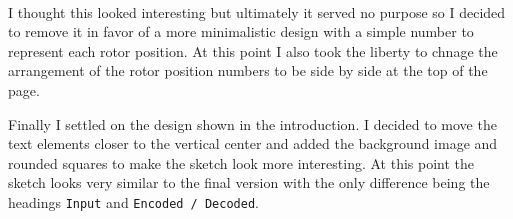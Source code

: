 \documentclass[12pt,a4paper]{article}
\begin{document}
		\begin{center}
			\\
		\end{center}
		\vspace{0.5cm}
		I thought this looked interesting but ultimately it served no purpose so I decided to 
		remove it in favor of a more minimalistic design with a simple number to represent 
		each rotor position. At this point I also took the liberty to chnage the arrangement of 
		the rotor position numbers to be side by side at the top of the page.\\
		
		\begin{center}
			\par
		\end{center}
		\vspace{0.5cm}
		Finally I settled on the design shown in the introduction. I decided to move the text 
		elements closer to the vertical center and added the background image and rounded squares 
		to make the sketch look more interesting. At this point the sketch looks very similar to the 
		final version with the only difference being the headings \texttt{Input} and 
		\texttt{Encoded / Decoded}.\\
\end{document}
